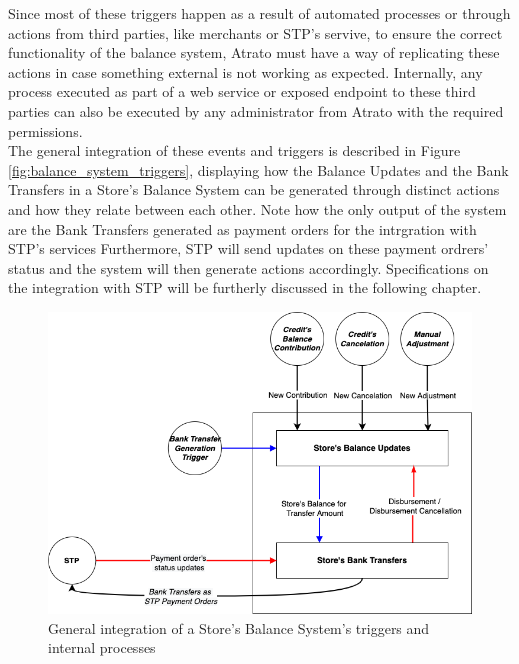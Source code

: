     
Since most of these triggers happen as a result of automated processes or through actions from third parties, like merchants or STP's servive, to ensure the correct functionality of the balance system, Atrato must have a way of replicating these actions in case something external is not working as expected. Internally, any process executed as part of a web service or exposed endpoint to these third parties can also be executed by any administrator from Atrato with the required permissions.\\
    
The general integration of these events and triggers is described in Figure \ref{fig:balance_system_triggers}, displaying how the Balance Updates and the Bank Transfers in a Store's Balance System can be generated through distinct actions and how they relate between each other. Note how the only output of the system are the Bank Transfers generated as payment orders for the intrgration with STP's services Furthermore, STP will send updates on these payment ordrers' status and the system will then generate actions accordingly. Specifications on the integration with STP will be furtherly discussed in the following chapter.

\begin{figure} [H]
    \centering
    \includegraphics[scale = 0.5]{assets/diagrams/BalanceSystemDiagram.drawio.png}
    \caption{General integration of a Store's Balance System's triggers and internal processes}\label{fig:balance_systen_diaran}
\end{figure}